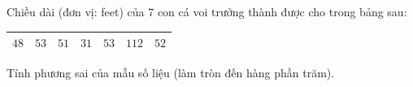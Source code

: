 \begin{ex}
Chiều dài (đơn vị: feet) của $7$ con cá voi trưởng thành được cho trong bảng sau:
\begin{center}
\begin{tabular}{|c|c|c|c|c|c|c|}\hline
$48$ & $53$ & $51$ & $31$ & $53$ & $112$ & $52$\\\hline
\end{tabular}
\end{center}
Tính phương sai của mẫu số liệu (làm tròn đến hàng phần trăm).
\end{ex}
